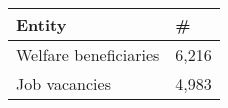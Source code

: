 
\begin{tabular}{ll}
\toprule
\textbf{Entity}                 &  \textbf{\#}   \\
\midrule
Welfare beneficiaries   & 6,216                     \\
Job vacancies           & 4,983                     \\
\bottomrule
\end{tabular}
